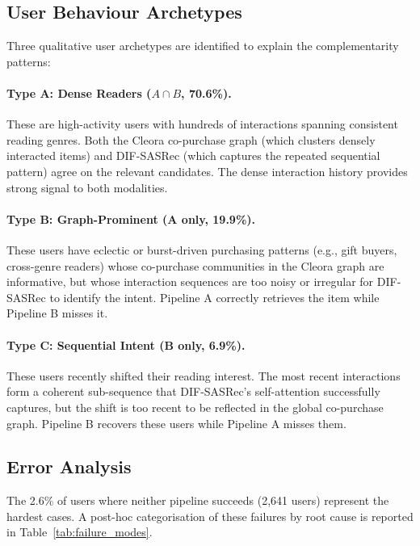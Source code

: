 \subsection{User Behaviour Archetypes}

Three qualitative user archetypes are identified to explain the complementarity patterns:

\paragraph{Type A: Dense Readers ($A \cap B$, 70.6\%).}
These are high-activity users with hundreds of interactions spanning consistent reading genres.
Both the Cleora co-purchase graph (which clusters densely interacted items) and DIF-SASRec (which captures the repeated sequential pattern) agree on the relevant candidates.
The dense interaction history provides strong signal to both modalities.

\paragraph{Type B: Graph-Prominent (A only, 19.9\%).}
These users have eclectic or burst-driven purchasing patterns (e.g., gift buyers, cross-genre readers) whose co-purchase communities in the Cleora graph are informative, but whose interaction sequences are too noisy or irregular for DIF-SASRec to identify the intent.
Pipeline A correctly retrieves the item while Pipeline B misses it.

\paragraph{Type C: Sequential Intent (B only, 6.9\%).}
These users recently shifted their reading interest.
The most recent interactions form a coherent sub-sequence that DIF-SASRec's self-attention successfully captures, but the shift is too recent to be reflected in the global co-purchase graph.
Pipeline B recovers these users while Pipeline A misses them.

\subsection{Error Analysis}

The 2.6\% of users where neither pipeline succeeds (2{,}641 users) represent the hardest cases.
A post-hoc categorisation of these failures by root cause is reported in Table~\ref{tab:failure_modes}.

